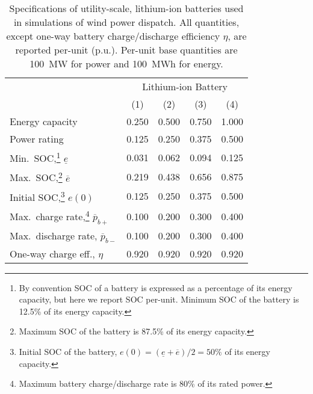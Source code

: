 \documentclass[conference]{IEEEtran}
\def\eff{\eta}
\begin{document}
\begin{table}[!t]
\begin{minipage}{0.5\textwidth}		%
	\caption{Specifications of utility-scale, lithium-ion batteries used in simulations of wind power dispatch.  All quantities, except one-way battery charge/discharge efficiency $\eta$, are reported per-unit (p.u.).  Per-unit base quantities are 100~MW for power and 100~MWh for energy.}
	\label{tbl:bess_specs}
	\begin{tabular}{l r r r r}
		\toprule
		& \multicolumn{4}{c}{Lithium-ion Battery} \\
		& \multicolumn{1}{c}{(1)}	& \multicolumn{1}{c}{(2)}	& \multicolumn{1}{c}{(3)}	& \multicolumn{1}{c}{(4)}	\\
		\midrule
		Energy capacity					& 0.250	& 0.500	& 0.750	& 1.000	\\
		Power rating						& 0.125	& 0.250	& 0.375	& 0.500	\\
		Min.\ SOC,\footnote{By convention SOC of a battery is expressed as a percentage of its energy capacity, but here we report SOC per-unit.  Minimum SOC of the battery is 12.5\% of its energy capacity.} $\underline{e}$	& 0.031	& 0.062	& 0.094	& 0.125	\\
		Max.\ SOC,\footnote{Maximum SOC of the battery is 87.5\% of its energy capacity.} $\overline{e}$	& 0.219	& 0.438	& 0.656	& 0.875	\\
		Initial SOC,\footnote{Initial SOC of the battery, $e(0) = (\underline{e}+\overline{e})/2 = 50\%$ of its energy capacity.}	$e(0)$	& 0.125	& 0.250	& 0.375	& 0.500	\\
		Max.\ charge rate,\footnote{Maximum battery charge/discharge rate is 80\% of its rated power.\label{fn:max_chrg_rt}} $\overline{p}_{b+}$	& 0.100	& 0.200	& 0.300	& 0.400	\\
		Max.\ discharge rate,\footref{fn:max_chrg_rt} $\overline{p}_{b-}$	& 0.100	& 0.200	& 0.300	& 0.400	\\
		One-way charge eff., $\eff$		& 0.920	& 0.920	& 0.920	& 0.920	\\
		\bottomrule
	\end{tabular}
\end{minipage}
\end{table}
\end{document}
